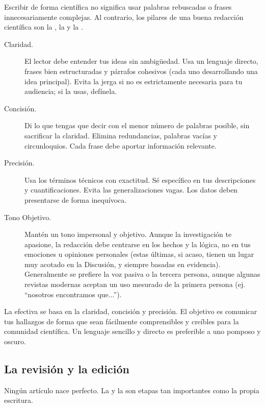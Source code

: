 Escribir de forma científica no significa usar palabras rebuscadas o frases innecesariamente complejas.
Al contrario, los pilares de una buena redacción científica son la , la  y la .

\begin{description}
	\item[Claridad.] El lector debe entender tus ideas sin ambigüedad.
	      Usa un lenguaje directo, frases bien estructuradas y párrafos cohesivos (cada uno desarrollando una idea principal).
	      Evita la jerga si no es estrictamente necesaria para tu audiencia; si la usas, defínela.
	\item[Concisión.] Di lo que tengas que decir con el menor número de palabras posible, sin sacrificar la claridad.
	      Elimina redundancias, palabras vacías y circunloquios.
	      Cada frase debe aportar información relevante.
	\item[Precisión.] Usa los términos técnicos con exactitud.
	      Sé específico en tus descripciones y cuantificaciones.
	      Evita las generalizaciones vagas.
	      Los datos deben presentarse de forma inequívoca.
	\item[Tono Objetivo.] Mantén un tono impersonal y objetivo.
	      Aunque la investigación te apasione, la redacción debe centrarse en los hechos y la lógica, no en tus emociones u opiniones personales (estas últimas, si acaso, tienen un lugar muy acotado en la Discusión, y siempre basadas en evidencia).
	      Generalmente se prefiere la voz pasiva o la tercera persona, aunque algunas revistas modernas aceptan un uso mesurado de la primera persona (ej. “nosotros encontramos que...”).
\end{description}

\begin{remember}
	\label{rem:claridadcientifica}
	La  efectiva se basa en la claridad,
	concisión y precisión.
	El objetivo es comunicar tus hallazgos de forma que sean fácilmente
	comprensibles y creíbles para la comunidad científica.
	Un lenguaje sencillo y directo es preferible a uno pomposo y oscuro.
\end{remember}

\subsection*{La revisión y la edición}
\label{sub:revisionyedicions}

Ningún artículo nace perfecto.
La  y la  son etapas tan importantes como la propia escritura.

